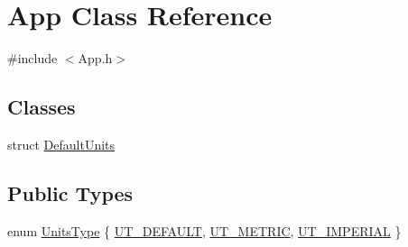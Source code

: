 \hypertarget{class_app}{\section{App Class Reference}
\label{class_app}
}


{\ttfamily \#include $<$App.\+h$>$}

\subsection*{Classes}
\begin{DoxyCompactItemize}
\item 
struct \hyperlink{struct_app_1_1_default_units}{Default\+Units}
\end{DoxyCompactItemize}
\subsection*{Public Types}
\begin{DoxyCompactItemize}
\item 
enum \hyperlink{class_app_aea5a9482f92f593735e0e6568c46b0d8}{Units\+Type} \{ \hyperlink{class_app_aea5a9482f92f593735e0e6568c46b0d8a7c7fdae6b9832748ec23644eebfcd51d}{U\+T\+\_\+\+D\+E\+F\+A\+U\+L\+T}, 
\hyperlink{class_app_aea5a9482f92f593735e0e6568c46b0d8ae892d830f9e69c46728781e9a53638ee}{U\+T\+\_\+\+M\+E\+T\+R\+I\+C}, 
\hyperlink{class_app_aea5a9482f92f593735e0e6568c46b0d8abec12c861c4181a6fcf6f36ceb4728fb}{U\+T\+\_\+\+I\+M\+P\+E\+R\+I\+A\+L}
 \}
\end{DoxyCompactItemize}
